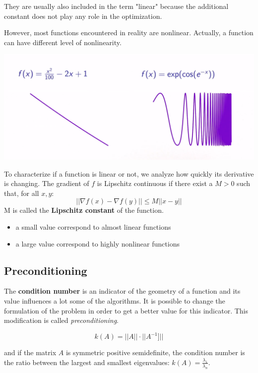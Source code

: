 They are usually also included in the term "linear" because the additional constant does not play any role in the optimization.


However, most functions encountered in reality are nonlinear. Actually, a function can have different level of nonlinearity.

\includegraphics[width=\linewidth]{content/nonlinearity.png}

To characterize if a function is linear or not, we analyze how quickly its derivative is changing. 
The gradient of $f$ is Lipschitz continuous if there exist a $M > 0$ such that, for all $x, y$:
\begin{equation}
    ||\nabla f(x)-\nabla f(y)|| \leq M||x-y||
\end{equation}
M is called the \textbf{Lipschitz constant} of the function.
\begin{itemize}
    \item a small value correspond to almost linear functions
    \item a large value correspond to highly nonlinear functions
\end{itemize}

\subsection{Preconditioning}

The \textbf{condition number} is an indicator of the geometry of a function and its value influences a lot some of the algorithms.
It is possible to change the formulation of the problem in order to get a better value for this indicator. This modification is called \textit{preconditioning}.

\begin{equation}
    k(A) = ||A||\cdot||A^{-1}]||
\end{equation}

and if the matrix $A$ is symmetric positive semidefinite, the condition number is the ratio between the largest and smallest eigenvalues: $k(A) = \frac{\lambda_1}{\lambda_n}$.


